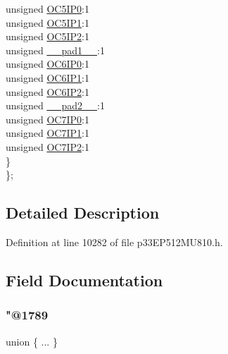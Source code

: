 \begin{DoxyCompactItemize}
\begin{tabbing}
\>\>unsigned \hyperlink{structtag_i_p_c10_b_i_t_s_a1b211cdfc64196db40fde1fd5d36530d}{OC5IP0}:1\\
\>\>unsigned \hyperlink{structtag_i_p_c10_b_i_t_s_a671defb9451e73130e9457ac114580c9}{OC5IP1}:1\\
\>\>unsigned \hyperlink{structtag_i_p_c10_b_i_t_s_a230461eaec30c56dea6bbcf09a808574}{OC5IP2}:1\\
\>\>unsigned \hyperlink{structtag_i_p_c10_b_i_t_s_acaf2d0924a107ec6e8d2e31febaf66f9}{\_\_pad1\_\_}:1\\
\>\>unsigned \hyperlink{structtag_i_p_c10_b_i_t_s_a7f641a0015d50cb366d513e61e813af7}{OC6IP0}:1\\
\>\>unsigned \hyperlink{structtag_i_p_c10_b_i_t_s_adca68d2f820730603a1213375f0af0bb}{OC6IP1}:1\\
\>\>unsigned \hyperlink{structtag_i_p_c10_b_i_t_s_aa73de07a07a73ff498c4e2eed0fbc36b}{OC6IP2}:1\\
\>\>unsigned \hyperlink{structtag_i_p_c10_b_i_t_s_a4d97cc5f7d51d22fc2bf3eab35c9cb7f}{\_\_pad2\_\_}:1\\
\>\>unsigned \hyperlink{structtag_i_p_c10_b_i_t_s_af5f6117fc32cf66520dd327b8ccf5da7}{OC7IP0}:1\\
\>\>unsigned \hyperlink{structtag_i_p_c10_b_i_t_s_a9f600be35e69046f9a66c4d416b378c8}{OC7IP1}:1\\
\>\>unsigned \hyperlink{structtag_i_p_c10_b_i_t_s_abab8cac4bb1b371fee6ae7dd78ad2312}{OC7IP2}:1\\
\>\} \\
\}; \\

\end{tabbing}\end{DoxyCompactItemize}


\subsection{Detailed Description}


Definition at line 10282 of file p33\+E\+P512\+M\+U810.\+h.



\subsection{Field Documentation}
\mbox{\label{structtag_i_p_c10_b_i_t_s_afe0004d5d88a472ed847a51c954f3987}} 
\subsubsection{\texorpdfstring{"@1789}{@1789}}
{\footnotesize\ttfamily union \{ ... \} }

